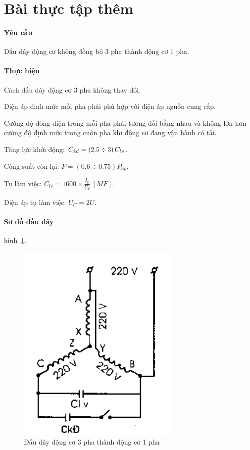 \documentclass[13pt,a4paper]{extarticle}
\begin{document}
\section{Bài thực tập thêm}
\paragraph{Yêu cầu}Đấu dây động cơ không đồng bộ 3 pha thành động cơ 1 pha.
\paragraph{Thực hiện}
\begin{list}{--}{}
\item Cách đấu dây động cơ 3 pha không thay đổi.
\item Điện áp định mức mỗi pha phải phù hợp với điện áp nguồn cung cấp.
\item Cường độ dòng điện trong mỗi pha phải tương đối bằng nhau và không lớn hơn cường độ định mức trong cuộn pha khi động cơ đang vận hành có tải.
\item Tăng lực khởi động: $C_{\text{\textit{kđ}}} = \left({2.5 \div 3}\right)C_{lv}$.
\item Công suất còn lại: $P = \left({0.6 \div 0.75}\right)P_{3p}$.
\item Tụ làm việc: $\displaystyle C_{lv} = 1600\times \frac{I_p}{U_p}~[MF]$.
\item Điện áp tụ làm việc: $U_C = 2U$.
\end{list}
\paragraph{Sơ đồ đấu dây} hình~\ref{Fig:3p-1p}.
\begin{figure}[!h]
\begin{center}
\includegraphics[scale=.6]{3p-1p}
\end{center}
\caption{Đấu dây động cơ 3 pha thành động cơ 1 pha}
\label{Fig:3p-1p}
\end{figure}
\newpage
\end{document}
